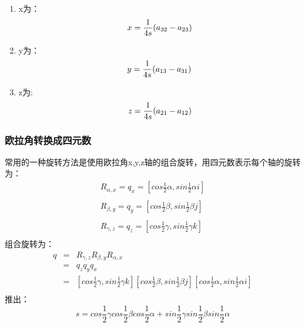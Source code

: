 \documentclass[a4paper,10pt]{article}
\begin{document}
\begin{CJK}{UTF8}{song}
\begin{enumerate}
\item x为：
\begin{displaymath}
 x=\frac{1}{4s}(a_{32}-a_{23})  \\
\end{displaymath}
\item y为：
\begin{displaymath}
 y=\frac{1}{4s}(a_{13}-a_{31}) \\
\end{displaymath}
\item z为:
\begin{displaymath}
 z=\frac{1}{4s}(a_{21}-a_{12}) \\
\end{displaymath}
\end{enumerate}
\subsubsection{欧拉角转换成四元数}
常用的一种旋转方法是使用欧拉角x,y,z轴的组合旋转，用四元数表示每个轴的旋转为：
\begin{displaymath}
\begin{array}{c}
R_{\alpha,x}=q_{x}=[cos\frac{1}{2}\alpha,sin\frac{1}{2}\alpha{}i] \\
\\
R_{\beta,y}=q_{y}=[cos\frac{1}{2}\beta,sin\frac{1}{2}\beta{}j] \\
\\
R_{\gamma,z}=q_{z}=[cos\frac{1}{2}\gamma,sin\frac{1}{2}\gamma{}k] \\
\end{array}
\end{displaymath}
组合旋转为：
\begin{displaymath}
\begin{array}{ccl}
q & = & R_{\gamma,z}R_{\beta,y}R_{\alpha,x} \\
  & = &q_{z}q_{y}q_{x}  \\
  & = &[cos\frac{1}{2}\gamma,sin\frac{1}{2}\gamma{}k]
       [cos\frac{1}{2}\beta,sin\frac{1}{2}\beta{}j] 
       [cos\frac{1}{2}\alpha,sin\frac{1}{2}\alpha{}i]  \\
\end{array}
\end{displaymath}
推出：
\begin{displaymath}
s=cos\frac{1}{2}\gamma{}cos\frac{1}{2}\beta{}cos\frac{1}{2}\alpha+sin\frac{1}{2}\gamma{}sin\frac{1}{2}\beta{}sin\frac{1}{2}\alpha 
\end{displaymath}
\begin{displaymath}

\end{displaymath}
\end{CJK}
\end{document}
